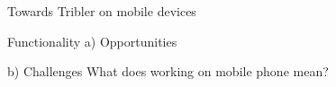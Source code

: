 Towards Tribler on mobile devices


Functionality
a) Opportunities


b) Challenges
What does working on mobile phone mean?

